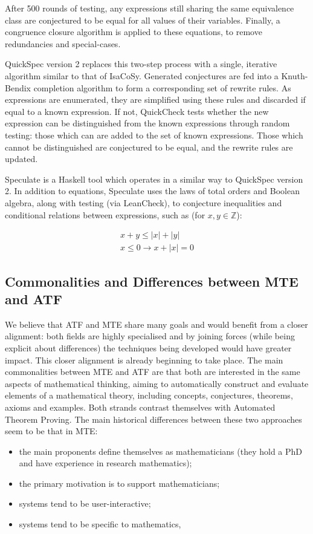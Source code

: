 After 500 rounds of testing, any expressions still sharing the same equivalence
class are conjectured to be equal for all values of their variables. Finally, a
congruence closure algorithm is applied to these equations, to remove
redundancies and special-cases.

QuickSpec version 2 replaces this two-step process with a single, iterative
algorithm similar to that of IsaCoSy. Generated conjectures are fed into a
Knuth-Bendix completion algorithm to form a corresponding set of rewrite rules.
As expressions are enumerated, they are simplified using these rules and
discarded if equal to a known expression. If not, QuickCheck tests whether the
new expression can be distinguished from the known expressions through random
testing: those which can are added to the set of known expressions. Those which
cannot be distinguished are conjectured to be equal, and the rewrite rules are
updated.

Speculate is a Haskell tool which operates in a similar way to QuickSpec
version 2. In addition to equations, Speculate uses the laws of total orders and
Boolean algebra, along with testing (via LeanCheck), to conjecture inequalities
and conditional relations between expressions, such as (for
$x, y \in \mathbb{Z}$):

\begin{equation*}
  \begin{aligned}
    x + y \leq \lvert x \rvert + \lvert y \rvert \\
    x \leq 0 \rightarrow x + \lvert x \rvert = 0
  \end{aligned}
\end{equation*}

\subsection{Commonalities and Differences between MTE and ATF}

We believe that ATF and MTE share many goals and would benefit from a
closer alignment: both fields are highly specialised and by joining
forces (while being explicit about differences) the techniques being
developed would have greater impact. This closer alignment is already
beginning to take place. The main commonalities between MTE and ATF
are that both are interested in the same aspects of mathematical
thinking, aiming to automatically construct and evaluate elements of a
mathematical theory, including concepts, conjectures, theorems, axioms
and examples. Both strands contrast themselves with Automated Theorem
Proving. The main historical differences between these two approaches
seem to be that in MTE:
\begin{itemize}
\item the main proponents define themselves as mathematicians (they
  hold a PhD and have experience in research mathematics);
\item the primary motivation is to support mathematicians;
\item systems tend to be user-interactive;
\item systems tend to be specific to mathematics,
\end{itemize}

